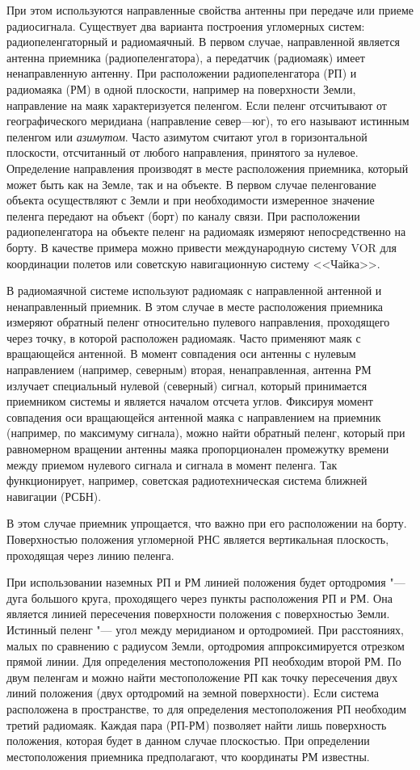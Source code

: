 \documentclass[../main.tex]{subfiles}
\begin{document}
При этом используются направленные свойства антенны при передаче или приеме радиосигнала. Существует два варианта построения угломерных систем: радиопеленгаторный и радиомаячный. В первом случае, направленной является антенна приемника (радиопеленгатора), а передатчик (радиомаяк) имеет ненаправленную антенну. При расположении радиопеленгатора (РП) и радиомаяка (РМ) в одной плоскости, например на поверхности Земли, направление на маяк характеризуется пеленгом. Если пеленг отсчитывают от географического меридиана (направление север—юг), то его называют истинным пеленгом или \textit{азимутом}. Часто азимутом считают угол в горизонтальной плоскости, отсчитанный от любого направления, принятого за нулевое. Определение направления производят в месте расположения приемника, который может быть как на Земле, так и на объекте. В первом случае пеленгование объекта осуществляют с Земли и при необходимости измеренное значение пеленга передают на объект (борт) по каналу связи. При расположении радиопеленгатора на объекте пеленг на радиомаяк измеряют непосредственно на борту. В качестве примера можно привести международную систему VOR для координации полетов или советскую навигационную систему <<Чайка>>.

В радиомаячной системе используют радиомаяк с направленной антенной и ненаправленный приемник. В этом случае в месте расположения приемника измеряют обратный пеленг относительно пулевого направления, проходящего через точку, в которой расположен радиомаяк. Часто применяют маяк с вращающейся антенной. В момент совпадения оси антенны с нулевым направлением (например, северным) вторая, ненаправленная, антенна РМ излучает специальный нулевой (северный) сигнал, который принимается приемником системы и является началом отсчета углов. Фиксируя момент совпадения оси вращающейся антенной маяка с направлением на приемник (например, по максимуму сигнала), можно найти обратный пеленг, который при равномерном вращении антенны маяка пропорционален промежутку времени между приемом нулевого сигнала и сигнала в момент пеленга. Так функционирует, например, советская радиотехническая система ближней навигации (РСБН).

В этом случае приемник упрощается, что важно при его расположении на борту. Поверхностью положения угломерной РНС является вертикальная плоскость, проходящая через линию пеленга.

При использовании наземных РП и РМ линией положения будет ортодромия "--- дуга большого круга, проходящего через пункты расположения РП и РМ. Она является линией пересечения поверхности положения с поверхностью Земли. Истинный пеленг "--- угол между меридианом и ортодромией. При расстояниях, малых по сравнению с радиусом Земли, ортодромия аппроксимируется отрезком прямой линии. Для определения местоположения РП необходим второй РМ. По двум пеленгам и можно найти местоположение РП как точку пересечения двух линий положения (двух ортодромий на земной поверхности). Если система расположена в пространстве, то для определения местоположения РП необходим третий радиомаяк. Каждая пара (РП-РМ) позволяет найти лишь поверхность положения, которая будет в данном случае плоскостью. При определении местоположения приемника предполагают, что координаты РМ известны.
\end{document}
